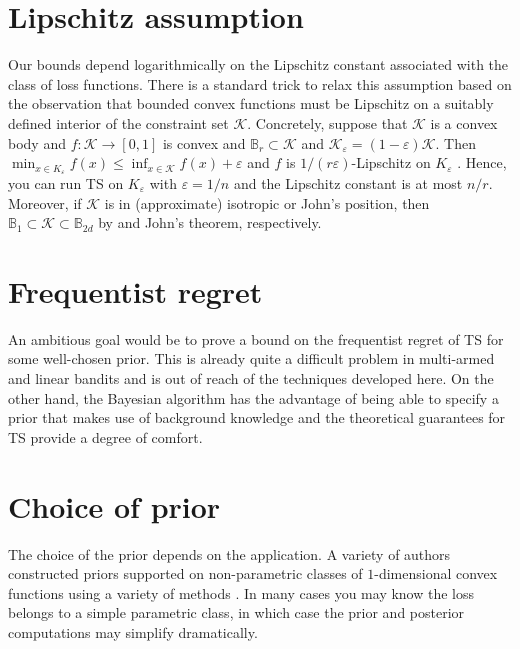 \documentclass[letter, 12pt]{report}
\newcommand{\ball}{\mathbb{B}}
\newcommand{\cK}{\mathcal K}
\newcommand{\1}{\mathbf{1}}
\newcommand{\ts}{\textsc{TS}\xspace}
\renewcommand{\epsilon}{\varepsilon}
\theoremstyle{plain}
\theoremstyle{definition}
\theoremstyle{remark}
\begin{document}
\section{Lipschitz assumption} Our bounds depend logarithmically on the Lipschitz constant associated with the class of loss functions.
There is a standard trick to relax this assumption based on the observation that bounded convex functions must be Lipschitz on a suitably defined
interior of the constraint set $\cK$.
Concretely, suppose that $\cK$ is a convex body and $f : \cK \to [0,1]$ is convex and $\ball_r \subset \cK$ and $\cK_\epsilon = (1 - \epsilon) \cK$.
Then $\min_{x \in K_\epsilon} f(x) \leq \inf_{x \in \cK} f(x) + \epsilon$ and $f$ is $1/(r\epsilon)$-Lipschitz on $K_\epsilon$ \citep[Chapter 3]{lat24book}.
Hence, you can run \ts{} on $K_\epsilon$ with $\epsilon = 1/n$ and the Lipschitz constant is at most $n/r$.
Moreover, if $\cK$ is in (approximate) isotropic or John's position, then $\ball_1 \subset \cK \subset \ball_{2d}$ by \cite{kannan1995isoperimetric}
and John's theorem, respectively.

\section{Frequentist regret}
An ambitious goal would be to prove a bound on the frequentist regret of \ts{} for some well-chosen prior.
This is already quite a difficult problem in multi-armed \citep{KKM12,AG12b} and linear bandits \citep{AG13} and is out of reach of the techniques developed here.
On the other hand, the Bayesian algorithm has the advantage of being able to specify a prior that makes use of background knowledge and the theoretical guarantees
for \ts{} provide a degree of comfort.

\section{Choice of prior} The choice of the prior depends on the application. A variety of authors constructed priors supported on non-parametric
classes of $1$-dimensional convex functions
using a variety of methods \citep{ramgopal1993nonparametric,chang2007shape,shively2011nonparametric}.
In many cases you may know the loss belongs to a simple parametric class, in which case the prior and posterior computations may simplify dramatically.
\end{document}
